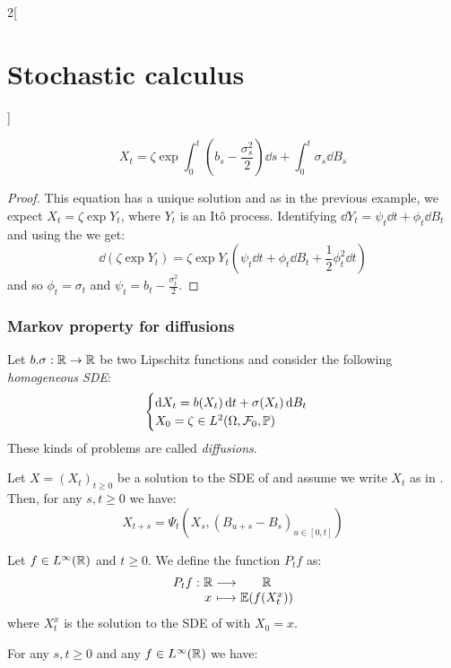 \documentclass[../../../main_math.tex]{subfiles}
\begin{document}
\begin{multicols}{2}[\section{Stochastic calculus}]
\begin{proposition}
    $$
      X_t=\zeta\exp{\int_0^t \left(b_s-\frac{\sigma_s^2}{2}\right)\dd{s}+\int_0^t \sigma_s\dd{B_s}}
    $$
  \end{proposition}
  \begin{proof}
    This equation has a unique solution and as in the previous example, we expect $X_t=\zeta \exp{Y_t}$, where $Y_t$ is an Itô process. Identifying $\dd{Y_t}=\psi_t\dd{t}+\phi_t\dd{B_t}$ and using the  we get:
    \begin{equation*}
      \dd{(\zeta \exp{Y_t})} =\zeta \exp{Y_t}\left(\psi_t\dd{t}+\phi_t\dd{B_t}+\frac{1}{2}\phi_t^2\dd{t}\right)
    \end{equation*}
    and so $\phi_t=\sigma_t$ and $\psi_t=b_t-\frac{\sigma_t^2}{2}$.
  \end{proof}
  \subsubsection{Markov property for diffusions}
  \begin{definition}
    Let $b.\sigma:\mathbb{R}\to\mathbb{R}$ be two Lipschitz functions and consider the following \emph{homogeneous SDE}:
    \begin{equation}\label{SC:homogeneous_SDE}
      \begin{cases}
        \dd{X_t}=b(X_t)\dd{t}+\sigma(X_t)\dd{B_t} \\
        X_0=\zeta\in L^2(\Omega,\mathcal{F}_0,\mathbb{P})
      \end{cases}
    \end{equation}
    These kinds of problems are called \emph{diffusions}.
  \end{definition}
  \begin{theorem}
    Let $X={(X_t)}_{t\geq 0}$ be a solution to the SDE of  and assume we write $X_t$ as in . Then, for any $s,t\geq 0$ we have:
    $$
      X_{t+s}=\Psi_{t}(X_s,{(B_{u+s}-B_s)}_{u\in[0,t]})
    $$
  \end{theorem}
  \begin{definition}
    Let $f\in L^\infty(\mathbb{R})$ and $t\geq 0$. We define the function $P_tf$ as:
    $$
      \function{P_tf}{\RR}{\RR}{x}{\Exp(f(X_t^x))}
    $$
    where $X_t^x$ is the solution to the SDE of  with $X_0=x$.
  \end{definition}
  \begin{corollary}
    For any $s,t\geq 0$ and any $f\in L^\infty(\mathbb{R})$ we have:
    $$
$$
\end{corollary}
\end{multicols}
\end{document}
